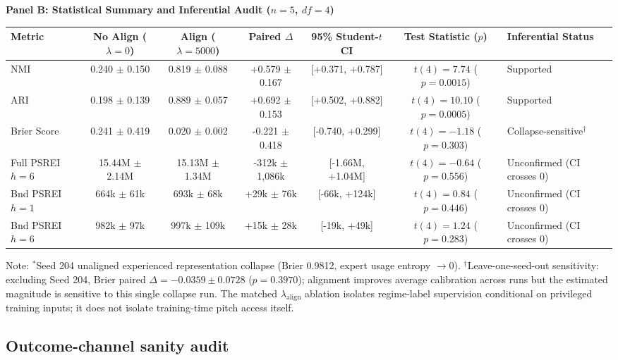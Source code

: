 \documentclass[
  journal]{IEEEtran}
\begin{document}
\begin{table}[!t]
\noindent\textbf{Panel B: Statistical Summary and Inferential Audit ($n=5$, $df=4$)}\par
\vspace{1mm}
\begin{tabular*}{\textwidth}{@{\extracolsep{\fill}}l ccc c c l@{}}
\toprule
Metric & No Align ($\lambda=0$) & Align ($\lambda=5000$) & Paired $\Delta$ & 95\% Student-$t$ CI & Test Statistic ($p$) & Inferential Status \\
\midrule
NMI & 0.240 $\pm$ 0.150 & 0.819 $\pm$ 0.088 & +0.579 $\pm$ 0.167 & [+0.371, +0.787] & $t(4) = 7.74$ ($p=0.0015$) & Supported \\
ARI & 0.198 $\pm$ 0.139 & 0.889 $\pm$ 0.057 & +0.692 $\pm$ 0.153 & [+0.502, +0.882] & $t(4) = 10.10$ ($p=0.0005$) & Supported \\
Brier Score & 0.241 $\pm$ 0.419 & 0.020 $\pm$ 0.002 & -0.221 $\pm$ 0.418 & [-0.740, +0.299] & $t(4) = -1.18$ ($p=0.303$) & Collapse-sensitive$^\dagger$ \\
Full PSREI $h=6$ & 15.44M $\pm$ 2.14M & 15.13M $\pm$ 1.34M & -312k $\pm$ 1,086k & [-1.66M, +1.04M] & $t(4) = -0.64$ ($p=0.556$) & Unconfirmed (CI crosses 0) \\
Bnd PSREI $h=1$ & 664k $\pm$ 61k & 693k $\pm$ 68k & +29k $\pm$ 76k & [-66k, +124k] & $t(4) = 0.84$ ($p=0.446$) & Unconfirmed (CI crosses 0) \\
Bnd PSREI $h=6$ & 982k $\pm$ 97k & 997k $\pm$ 109k & +15k $\pm$ 28k & [-19k, +49k] & $t(4) = 1.24$ ($p=0.283$) & Unconfirmed (CI crosses 0) \\
\bottomrule
\end{tabular*}
\vspace{1mm}
\raggedright\fontsize{8.0pt}{9.0pt}\selectfont Note: $^\ast$Seed 204 unaligned experienced representation collapse (Brier 0.9812, expert usage entropy $\to 0$). $^\dagger$Leave-one-seed-out sensitivity: excluding Seed 204, Brier paired $\Delta = -0.0359 \pm 0.0728$ ($p=0.3970$); alignment improves average calibration across runs but the estimated magnitude is sensitive to this single collapse run. The matched $\lambda_{\text{align}}$ ablation isolates regime-label supervision conditional on privileged training inputs; it does not isolate training-time pitch access itself.
\end{table}

\FloatBarrier

\subsection*{Outcome-channel sanity
audit}\label{outcome-channel-sanity-audit}
\end{document}
